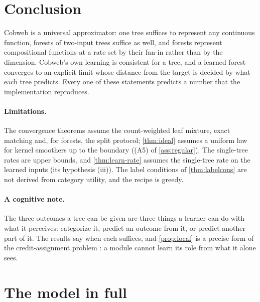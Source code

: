 \documentclass[11pt]{article}
\theoremstyle{definition}
\theoremstyle{remark}
\begin{document}
\section{Conclusion}\label{sec:conclusion}

Cobweb is a universal approximator: one tree suffices to represent any continuous
function, forests of two-input trees suffice as well, and forests represent compositional
functions at a rate set by their fan-in rather than by the dimension.  Cobweb's own
learning is consistent for a tree, and a learned forest converges to an explicit limit
whose distance from the target is decided by what each tree predicts.  Every one of these
statements predicts a number that the implementation reproduces.

\paragraph{Limitations.}
The convergence theorems assume the count-weighted leaf mixture, exact matching and, for
forests, the split protocol; \cref{thm:ideal} assumes a uniform law for kernel smoothers up
to the boundary ((A5) of \cref{ass:regular}).  The single-tree rates are upper bounds, and \cref{thm:learn-rate} assumes the single-tree
rate on the learned inputs (its hypothesis (iii)).  The label conditions
of \cref{thm:labelcons} are not derived from category utility, and the recipe is greedy.

\paragraph{A cognitive note.}
The three outcomes a tree can be given are three things a learner can do with what it
perceives: categorize it, predict an outcome from it, or predict another part of it.  The
results say when each suffices, and \cref{prop:local} is a precise form of the
credit-assignment problem \citep{minsky1961}: a module cannot learn its role from what it
alone sees.

\appendix
{}


\section{The model in full}\label{app:model}\label{sec:model}
\end{document}
